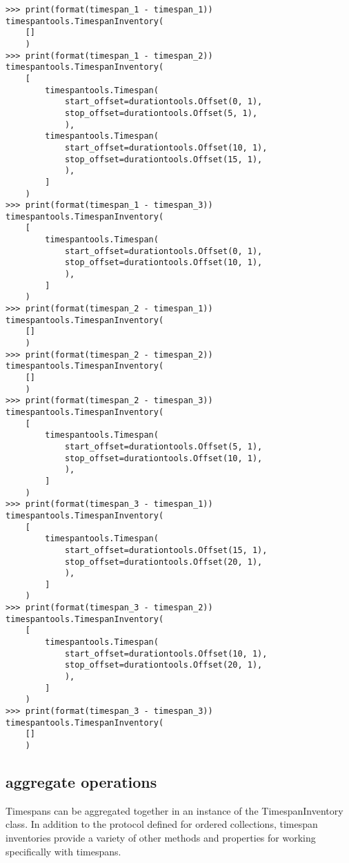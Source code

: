 \begin{singlespacing}
\begin{lstlisting}
>>> print(format(timespan_1 - timespan_1))
timespantools.TimespanInventory(
    []
    )
>>> print(format(timespan_1 - timespan_2))
timespantools.TimespanInventory(
    [
        timespantools.Timespan(
            start_offset=durationtools.Offset(0, 1),
            stop_offset=durationtools.Offset(5, 1),
            ),
        timespantools.Timespan(
            start_offset=durationtools.Offset(10, 1),
            stop_offset=durationtools.Offset(15, 1),
            ),
        ]
    )
>>> print(format(timespan_1 - timespan_3))
timespantools.TimespanInventory(
    [
        timespantools.Timespan(
            start_offset=durationtools.Offset(0, 1),
            stop_offset=durationtools.Offset(10, 1),
            ),
        ]
    )
>>> print(format(timespan_2 - timespan_1))
timespantools.TimespanInventory(
    []
    )
>>> print(format(timespan_2 - timespan_2))
timespantools.TimespanInventory(
    []
    )
>>> print(format(timespan_2 - timespan_3))
timespantools.TimespanInventory(
    [
        timespantools.Timespan(
            start_offset=durationtools.Offset(5, 1),
            stop_offset=durationtools.Offset(10, 1),
            ),
        ]
    )
>>> print(format(timespan_3 - timespan_1))
timespantools.TimespanInventory(
    [
        timespantools.Timespan(
            start_offset=durationtools.Offset(15, 1),
            stop_offset=durationtools.Offset(20, 1),
            ),
        ]
    )
>>> print(format(timespan_3 - timespan_2))
timespantools.TimespanInventory(
    [
        timespantools.Timespan(
            start_offset=durationtools.Offset(10, 1),
            stop_offset=durationtools.Offset(20, 1),
            ),
        ]
    )
>>> print(format(timespan_3 - timespan_3))
timespantools.TimespanInventory(
    []
    )
\end{lstlisting}
\end{singlespacing}

\subsection{aggregate operations}

Timespans can be aggregated together in an instance of the TimespanInventory
class. In addition to the protocol defined for ordered collections, timespan
inventories provide a variety of other methods and properties for working
specifically with timespans.

